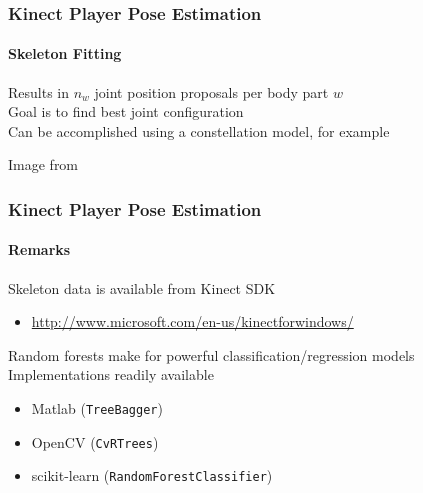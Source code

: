 \documentclass[xetex,professionalfont]{beamer}
\begin{document}

\begin{frame}
\frametitle{Kinect Player Pose Estimation}
\framesubtitle{Skeleton Fitting}

Results in $n_w$ joint position proposals per body part $w$\\\medskip %
Goal is to find best joint configuration\\\medskip
Can be accomplished using a constellation model, for example %

\bigskip
\begin{center}
    {\centering Image from \cite{fischler1973}}
\end{center}

\end{frame}


\begin{frame}
\frametitle{Kinect Player Pose Estimation}
\framesubtitle{Remarks}

Skeleton data is available from Kinect SDK
\begin{itemize}
    \item \url{http://www.microsoft.com/en-us/kinectforwindows/}
\end{itemize}

\bigskip
Random forests make for powerful classification/regression models\\\medskip
Implementations readily available
\begin{itemize}
    \item Matlab (\texttt{TreeBagger})
    \item OpenCV (\texttt{CvRTrees})
    \item scikit-learn (\texttt{RandomForestClassifier})
\end{itemize}

\end{frame}
\end{document}
